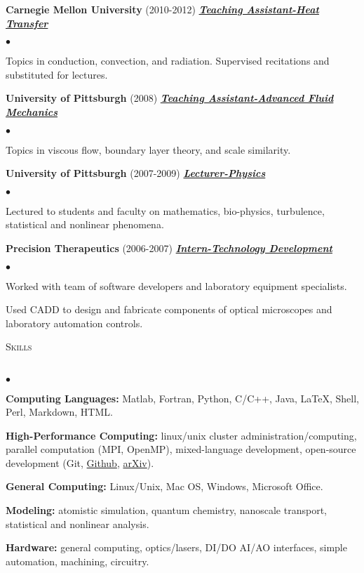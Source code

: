 \documentclass{article}
\newcommand{\lineunder}{\vspace*{-8pt} \\ \hspace*{-18pt} \hrulefill \\}
\newcommand{\header}[1]{{\hspace*{-15pt}\vspace*{6pt} \textsc{#1}} \vspace*{-6pt} \lineunder}
\newcommand{\employer}[3]{{ \textbf{#1} (#2) \underline{\textbf{\emph{#3}}}\\  }}
\newenvironment{achievements}{\begin{list}{$\bullet$}{\topsep 0pt \itemsep -2pt}}{\vspace*{4pt}\end{list}}
\begin{document}
\employer{Carnegie Mellon University}{2010-2012}{Teaching Assistant-Heat Transfer}
	\begin{achievements}
	\item Topics in conduction, convection, and radiation. Supervised recitations and substituted for lectures. 
	\end{achievements}

\employer{University of Pittsburgh}{2008}{Teaching Assistant-Advanced Fluid Mechanics}
	\begin{achievements}
	\item Topics in viscous flow, boundary layer theory, and scale similarity. 
	\end{achievements}

\employer{University of Pittsburgh}{2007-2009}{Lecturer-Physics}
	\begin{achievements}
	\item Lectured to students and faculty on mathematics, bio-physics, turbulence, statistical and nonlinear phenomena. 
	\end{achievements}

\employer{Precision Therapeutics}{2006-2007}{Intern-Technology Development}
	\begin{achievements}
	\item Worked with team of software developers and laboratory equipment specialists.
	\item Used CADD to design and fabricate components of optical microscopes and laboratory automation controls. 
	\end{achievements}

\header{Skills}
\begin{achievements}

\item \textbf{Computing Languages:} Matlab, Fortran, Python, C/C++, Java, \LaTeX, Shell, Perl, Markdown, HTML.

\item \textbf{High-Performance Computing:} linux/unix cluster administration/computing, parallel computation (MPI, OpenMP), mixed-language development, open-source development (Git, \href{http://github.com/jasonlarkin}{Github}, \href{http://arxiv.org/find/physics/1/au:+Larkin_J/0/1/0/all/0/1}{arXiv}).

\item \textbf{General Computing:} Linux/Unix, Mac OS, Windows, Microsoft Office.

\item \textbf{Modeling:} atomistic simulation, quantum chemistry, nanoscale transport, statistical and nonlinear analysis.

\item \textbf{Hardware:} general computing, optics/lasers, DI/DO AI/AO interfaces, simple automation, machining, circuitry. 
\end{achievements}
\end{document}
